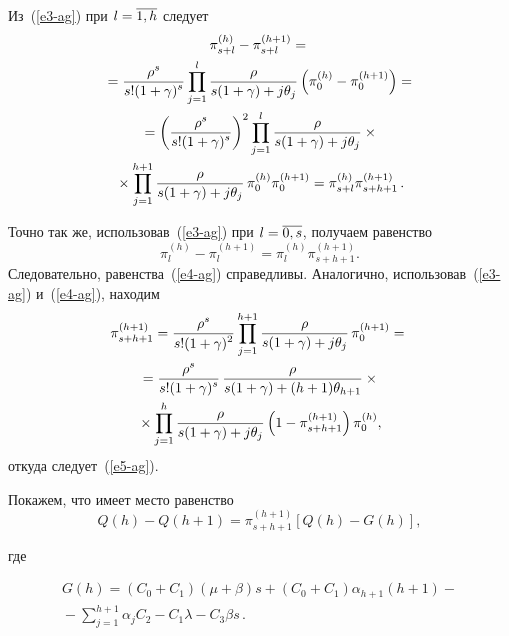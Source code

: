 \begin{multicols}{2}
  Из~(\ref{e3-ag}) при $l\hm=\overline{1,  h}$ следует 
  \begin{multline*}
  \pi^{(h)}_{s+l} -\pi_{s+l}^{(h+1)} ={}\\
  {}=\displaystyle\frac{\displaystyle \rho^s\mathstrut}{\displaystyle s!(1+\gamma)^s\mathstrut} 
\prod\limits^l_{j=1} \displaystyle\frac{\displaystyle \rho\mathstrut}{\displaystyle s(1+\gamma)+j\theta_j\mathstrut} \left( \pi_0^{(h)} -
\pi_0^{(h+1)}\right) ={}\\
  {}= \left( \displaystyle\frac{\displaystyle \rho^s\mathstrut}{\displaystyle s!(1+\gamma)^s\mathstrut}\right)^2 \prod\limits^l_{j=1} 
\displaystyle\frac{\displaystyle \rho\mathstrut}{\displaystyle s(1+\gamma)+j\theta_j\mathstrut}\times{}\\
{}\times  \prod\limits^{h+1}_{j=1} 
\displaystyle\frac{\displaystyle \rho\mathstrut}{\displaystyle s(1+\gamma)+j\theta_j\mathstrut}\,\pi_0^{(h)} \pi_0^{(h+1)}= \pi^{(h)}_{s+l} \pi_{s+h+1}^{(h+1)}\,.
  \end{multline*}
  
  Точно так же, использовав~(\ref{e3-ag}) при $l\hm= \overline{0, s}$, получаем 
равенство 
$$
\pi_l^{(h)} - \pi_l^{(h+1)} = \pi_l^{(h)} \pi^{(h+1)}_{s+h+1}.
$$ 
Следовательно, равенства~(\ref{e4-ag}) справедливы. Аналогично, 
использовав~(\ref{e3-ag}) и~(\ref{e4-ag}), находим
  \begin{multline*}
  \pi^{(h+1)}_{s+h+1} =\displaystyle\frac{\displaystyle \rho^s\mathstrut}{\displaystyle s!(1+\gamma)^2\mathstrut} \prod\limits_{j=1}^{h+1} 
\displaystyle\frac{\displaystyle \rho\mathstrut}{\displaystyle s(1+\gamma)+j\theta_j\mathstrut}\,\pi_0^{(h+1)}={}\\
  {}= 
  \displaystyle\frac{\displaystyle \rho^s\mathstrut}{\displaystyle s!(1+\gamma)^s\mathstrut}\,
  \displaystyle\frac{\displaystyle \rho\mathstrut}{\displaystyle s(1+\gamma)+(h+1)\theta_{h+1}\mathstrut} \times{}\\
  {}\times \prod\limits^h_{j=1} \displaystyle\frac{\displaystyle \rho\mathstrut}{\displaystyle s(1+\gamma)+j\theta_j\mathstrut} \left( 1-\pi^{(h+1)}_{s+h+1}\right) \pi_0^{(h)},
  \end{multline*}
откуда следует~(\ref{e5-ag}).

  Покажем, что имеет место равенство
  \begin{equation}
  Q(h)-Q(h+1) =\pi_{s+h+1}^{(h+1)}\left[ Q(h)-G(h)\right],
  \label{e6-ag}
  \end{equation}
  
\vspace*{-12pt}
  
  \columnbreak 


\noindent
где



\noindent
\begin{multline}
G(h)=\left( C_0+C_1\right) (\mu+\beta)s +\left( C_0+C_1\right) \alpha_{h+1}(h+1) -
{}\\
{}- \sum\limits_{j=1}^{h+1} \alpha_j C_2 - C_1\lambda -C_3\beta s\,.
\label{e7-ag}
\end{multline}

\vspace*{-6pt}
  

\end{multicols}
